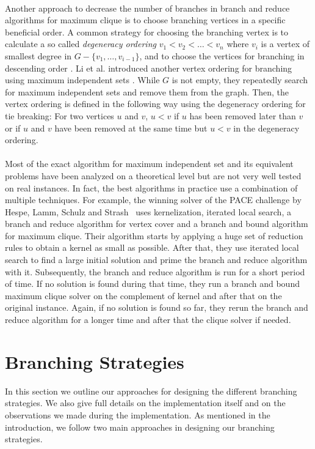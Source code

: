 \documentclass[]{article}
\begin{document}
\paragraph{}
Another approach to decrease the number of branches in branch and reduce algorithms for maximum clique is to choose branching vertices in a specific beneficial order. A common strategy for choosing the branching vertex is to calculate a so called \textit{degeneracy ordering} $v_1 < v_2 < \dots < v_n$ where $v_i$ is a vertex of smallest degree in $G - \{v_1, \dots, v_{i-1} \}$, and to choose the vertices for branching in descending order \cite{CarraghanPardalos}. Li et al. introduced another vertex ordering for branching using maximum independent sets \cite{LiFangXu}. While $G$ is not empty, they repeatedly search for maximum independent sets and remove them from the graph. Then, the vertex ordering is defined in the following way using the degeneracy ordering for tie breaking: For two vertices $u$ and $v$, $u < v$ if $u$ has been removed later than $v$ or if $u$ and $v$ have been removed at the same time but $u < v$ in the degeneracy ordering. 
 
\paragraph{}
Most of the exact algorithm for maximum independent set and its equivalent problems have been analyzed on a theoretical level but are not very well tested on real instances. In fact, the best algorithms in practice use a combination of multiple techniques. For example, the winning solver of the PACE challenge by Hespe, Lamm, Schulz and Strash~\cite{bibid} uses kernelization, iterated local search, a branch and reduce algorithm for vertex cover and a branch and bound algorithm for maximum clique. Their algorithm starts by applying a huge set of reduction rules to obtain a kernel as small as possible. After that, they use iterated local search to find a large initial solution and prime the branch and reduce algorithm with it. Subsequently, the branch and reduce algorithm is run for a short period of time. If no solution is found during that time, they run a branch and bound maximum clique solver on the complement of kernel and after that on the original instance. Again, if no solution is found so far, they rerun the branch and reduce algorithm for a longer time and after that the clique solver if needed.

\newpage
\section{Branching Strategies} \label{sec4}
In this section we outline our approaches for designing the different branching strategies. We also give full details on the implementation itself and on the observations we made during the implementation. As mentioned in the introduction, we follow two main approaches in designing our branching strategies. 
\end{document}
